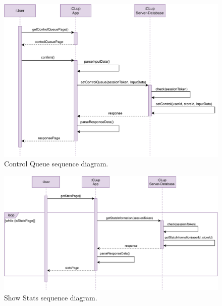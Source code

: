 \begin{figure}[H]
	\centering
	\includegraphics[width=1.0\textwidth]{images/getControlQueuePage_sequence_diagram.pdf}
	\caption{Control Queue sequence diagram.}
\end{figure}

\begin{figure}[H]
	\centering
	\includegraphics[width=1.0\textwidth]{images/getShowStatsPage_sequence_diagram.pdf}
	\caption{Show Stats sequence diagram.}
\end{figure}

